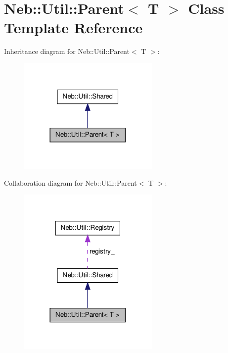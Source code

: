 \hypertarget{classNeb_1_1Util_1_1Parent}{\section{\-Neb\-:\-:\-Util\-:\-:\-Parent$<$ \-T $>$ \-Class \-Template \-Reference}
\label{classNeb_1_1Util_1_1Parent}
}


\-Inheritance diagram for \-Neb\-:\-:\-Util\-:\-:\-Parent$<$ \-T $>$\-:\nopagebreak
\begin{figure}[H]
\begin{center}
\leavevmode
\includegraphics[width=194pt]{classNeb_1_1Util_1_1Parent__inherit__graph}
\end{center}
\end{figure}


\-Collaboration diagram for \-Neb\-:\-:\-Util\-:\-:\-Parent$<$ \-T $>$\-:\nopagebreak
\begin{figure}[H]
\begin{center}
\leavevmode
\includegraphics[width=194pt]{classNeb_1_1Util_1_1Parent__coll__graph}
\end{center}
\end{figure}

